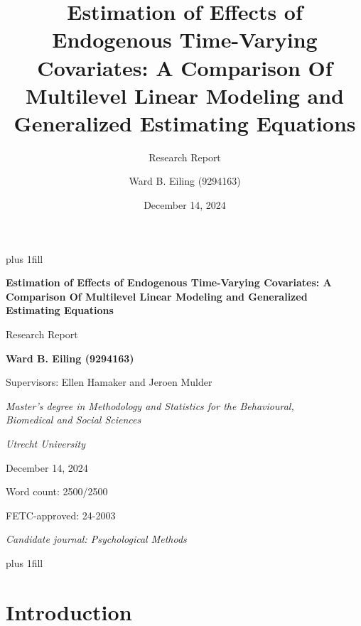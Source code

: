 \documentclass[
  11pt,
  a4paper,
]{article}
\title{Estimation of Effects of Endogenous Time-Varying Covariates: A
Comparison Of Multilevel Linear Modeling and Generalized Estimating
Equations}
\subtitle{Research Report}
\author{Ward B. Eiling (9294163)}
\date{December 14, 2024}
\begin{document}
\cleardoublepage
\thispagestyle{empty}
{\centering
\hbox{}\vskip 0cm plus 1fill
{\Large\bfseries Estimation of Effects of Endogenous Time-Varying
Covariates: A Comparison Of Multilevel Linear Modeling and Generalized
Estimating Equations \par}
\vspace{3ex}
{\large Research Report \par}
\vspace{9ex}
{\large\bfseries Ward B. Eiling (9294163) \par}
\vspace{3ex}
{\large Supervisors: Ellen Hamaker and Jeroen Mulder \par}
\vspace{9ex}
{\normalsize \textit{Master's degree in Methodology and Statistics for the Behavioural, \\ Biomedical and Social Sciences} \par}
\vspace{3ex}
{\normalsize \textit{Utrecht University} \par}
\vspace{9ex}
{\normalsize December 14, 2024 \par}
\vspace{3ex}
{\normalsize Word count: 2500/2500 \par}
\vspace{9ex}
{\normalsize FETC-approved: 24-2003 \par}
\vspace{9ex}
{\normalsize \textit{Candidate journal: Psychological Methods} \par}
\hbox{}\vskip 0cm plus 1fill
}


\newpage

\section{Introduction}\label{introduction}
\end{document}
